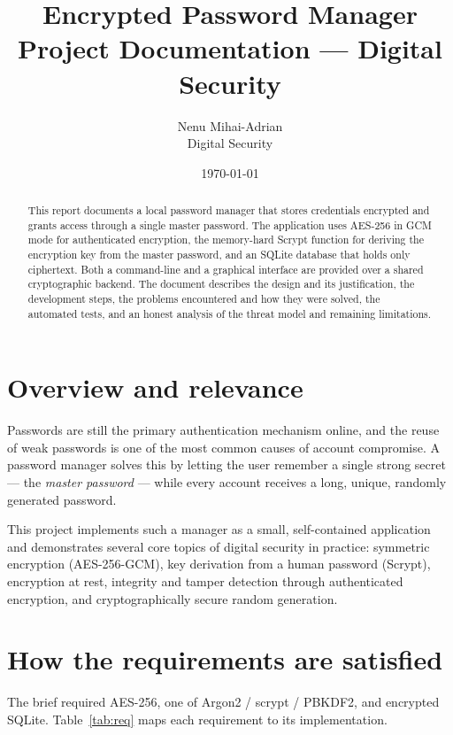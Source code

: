\documentclass[11pt,a4paper]{article}
\title{\vspace{-1cm}\color{accent}\textbf{Encrypted Password Manager}\\[0.3cm]
       \large\color{black}Project Documentation --- Digital Security}
\author{Nenu Mihai-Adrian\\ \small Digital Security}
\date{\today}
\begin{document}
\maketitle
\thispagestyle{empty}

\begin{abstract}
\noindent This report documents a local password manager that stores credentials
encrypted and grants access through a single master password. The application
uses AES-256 in GCM mode for authenticated encryption, the memory-hard Scrypt
function for deriving the encryption key from the master password, and an SQLite
database that holds only ciphertext. Both a command-line and a graphical
interface are provided over a shared cryptographic backend. The document
describes the design and its justification, the development steps, the problems
encountered and how they were solved, the automated tests, and an honest
analysis of the threat model and remaining limitations.
\end{abstract}

\tableofcontents
\newpage

\section{Overview and relevance}
Passwords are still the primary authentication mechanism online, and the reuse
of weak passwords is one of the most common causes of account compromise. A
password manager solves this by letting the user remember a single strong
secret --- the \emph{master password} --- while every account receives a long,
unique, randomly generated password.

This project implements such a manager as a small, self-contained application
and demonstrates several core topics of digital security in practice:
symmetric encryption (AES-256-GCM), key derivation from a human password
(Scrypt), encryption at rest, integrity and tamper detection through
authenticated encryption, and cryptographically secure random generation.

\section{How the requirements are satisfied}
The brief required AES-256, one of Argon2 / scrypt / PBKDF2, and encrypted
SQLite. Table~\ref{tab:req} maps each requirement to its implementation.
\end{document}
